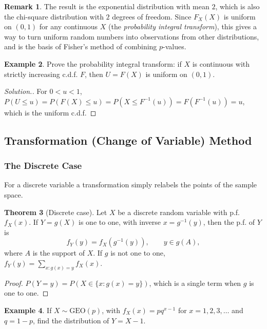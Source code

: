 \documentclass[12pt,a4paper]{report}
\theoremstyle{definition}
\newtheorem{thm}{Theorem}[section]
\newtheorem{example}[thm]{Example}
\newtheorem{remark}[thm]{Remark}
\theoremstyle{plain}
\newenvironment{solution}
  {\renewcommand{\qedsymbol}{}\begin{proof}[\textit{Solution}.]}
  {\end{proof}}
\begin{document}
\begin{remark}
The result is the exponential distribution with mean $2$, which is also the
chi-square distribution with $2$ degrees of freedom. Since $F_X(X)$ is uniform on
$(0,1)$ for any continuous $X$ (the \emph{probability integral transform}), this
gives a way to turn uniform random numbers into observations from other
distributions, and is the basis of Fisher's method of combining $p$-values.
\end{remark}

\begin{example}
\label{ex:probintegral}
Prove the probability integral transform: if $X$ is continuous with strictly
increasing c.d.f. $F$, then $U = F(X)$ is uniform on $(0,1)$.
\end{example}

\begin{solution}
For $0<u<1$, $P(U\leq u) = P(F(X)\leq u) = P\left(X\leq F^{-1}(u)\right) =
F\left(F^{-1}(u)\right) = u$, which is the uniform c.d.f.
\end{solution}

\subsection{Transformation (Change of Variable) Method}

\subsubsection{The Discrete Case}

For a discrete variable a transformation simply relabels the points of the
sample space.

\begin{thm}[Discrete case]
\label{thm:transdiscrete}
Let $X$ be a discrete random variable with p.f. $f_X(x)$. If $Y = g(X)$ is one
to one, with inverse $x = g^{-1}(y)$, then the p.f. of $Y$ is
\[ f_Y(y) = f_X\left(g^{-1}(y)\right) ,\qquad y \in g(A),\]
where $A$ is the support of $X$. If $g$ is not one to one,
$f_Y(y) = \sum_{x : g(x) = y}f_X(x)$.
\end{thm}

\begin{proof}
$P(Y = y) = P(X\in\{x : g(x) = y\})$, which is a single term when $g$ is one to
one.
\end{proof}

\begin{example}
\label{ex:geometricshift}
If $X \sim \text{GEO}(p)$, with $f_X(x) = pq^{x-1}$ for $x = 1, 2, 3, \dots$ and
$q = 1 - p$, find the distribution of $Y = X - 1$.
\end{example}
\end{document}
